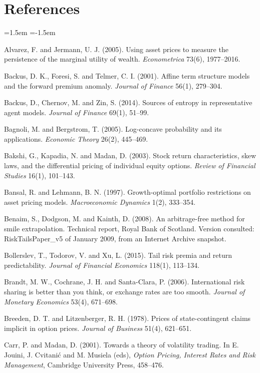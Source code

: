 \documentclass[11pt]{article}
\theoremstyle{remark}
\begin{document}
\section*{References}
\begin{list}{}{\leftmargin=1.5em \itemindent=-1.5em \itemsep=2pt \parsep=0pt}\small
\item Alvarez, F. and Jermann, U. J. (2005). Using asset prices to measure the persistence of the marginal utility of wealth. \emph{Econometrica} 73(6), 1977--2016.
\item Backus, D. K., Foresi, S. and Telmer, C. I. (2001). Affine term structure models and the forward premium anomaly. \emph{Journal of Finance} 56(1), 279--304.
\item Backus, D., Chernov, M. and Zin, S. (2014). Sources of entropy in representative agent models. \emph{Journal of Finance} 69(1), 51--99.
\item Bagnoli, M. and Bergstrom, T. (2005). Log-concave probability and its applications. \emph{Economic Theory} 26(2), 445--469.
\item Bakshi, G., Kapadia, N. and Madan, D. (2003). Stock return characteristics, skew laws, and the differential pricing of individual equity options. \emph{Review of Financial Studies} 16(1), 101--143.
\item Bansal, R. and Lehmann, B. N. (1997). Growth-optimal portfolio restrictions on asset pricing models. \emph{Macroeconomic Dynamics} 1(2), 333--354.
\item Benaim, S., Dodgson, M. and Kainth, D. (2008). An arbitrage-free method for smile extrapolation. Technical report, Royal Bank of Scotland. Version consulted: RiskTailsPaper\_v5 of January 2009, from an Internet Archive snapshot.
\item Bollerslev, T., Todorov, V. and Xu, L. (2015). Tail risk premia and return predictability. \emph{Journal of Financial Economics} 118(1), 113--134.
\item Brandt, M. W., Cochrane, J. H. and Santa-Clara, P. (2006). International risk sharing is better than you think, or exchange rates are too smooth. \emph{Journal of Monetary Economics} 53(4), 671--698.
\item Breeden, D. T. and Litzenberger, R. H. (1978). Prices of state-contingent claims implicit in option prices. \emph{Journal of Business} 51(4), 621--651.
\item Carr, P. and Madan, D. (2001). Towards a theory of volatility trading. In E. Jouini, J. Cvitani\'c and M. Musiela (eds), \emph{Option Pricing, Interest Rates and Risk Management}, Cambridge University Press, 458--476.

\end{list}
\end{document}
